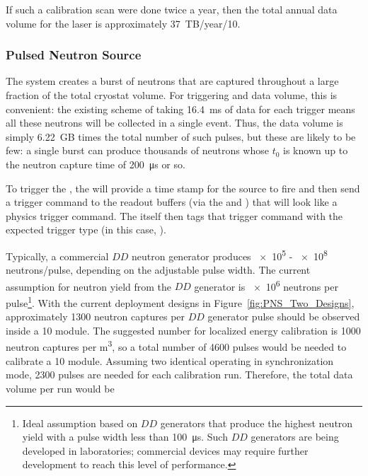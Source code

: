 If such a calibration scan were done twice a year, then the total annual data volume for the laser is approximately \num{37}~TB/year/\SI{10}{\kt}.

\subsubsection{Pulsed Neutron Source}

The  system creates a burst of neutrons that
are captured throughout a large fraction of the total cryostat volume. For triggering and data volume, this is convenient: the existing scheme of taking \SI{16.4}{\milli\s} of data for each trigger means all these neutrons will be collected in a single  event.%
Thus, the data volume is simply \num{6.22}~GB times the total number of such pulses, but these are likely to be few: a single burst can produce thousands of neutrons whose $t_0$ is known up to the neutron capture time of \SI{200}{\micro\s} or so.

To trigger the , the  will provide a time stamp for the source to fire and then send a trigger command to the  readout buffers (via the  and ) that will look like a physics trigger command.  The  itself then tags that trigger command with the expected trigger type (in this case, ).

Typically, a commercial $DD$ neutron generator produces \num{e5} - \num{e8} neutrons/pulse, depending on the adjustable pulse width. The current assumption for neutron yield from the $DD$ generator is \num{e6} neutrons per pulse\footnote{Ideal assumption based on $DD$ generators that produce the highest neutron yield with a pulse width less than \SI{100}{\micro\s}. Such $DD$ generators are being developed in laboratories; commercial devices may require further development to reach this level of performance.}. With the current deployment designs in Figure~\ref{fig:PNS_Two_Designs}, approximately \num{1300} neutron captures per $DD$ generator pulse should be observed inside a \SI{10}{\kt} module. The suggested number for localized energy calibration is \num{1000} neutron captures per \si{\cubic\m}, so a total number of \num{4600} pulses would be needed to calibrate a \SI{10}{\kt} module. Assuming two identical  operating in synchronization mode, \num{2300} pulses are needed for each calibration run. Therefore, the total data volume per run would be

